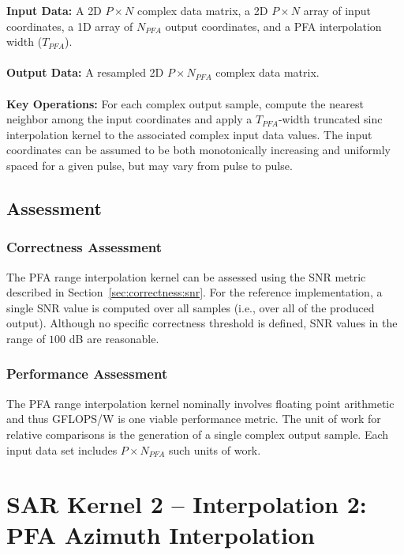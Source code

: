 \documentclass{report}
\begin{document}
\textbf{Input Data:} A {2D} $P \times N$ complex data matrix,
a {2D} $P \times N$ array of input coordinates, a {1D} array
of $N_{PFA}$ output coordinates, and a PFA interpolation width ($T_{PFA}$). \\ \\
\textbf{Output Data:} 
A resampled {2D} $P \times N_{PFA}$ complex data matrix. \\ \\
\textbf{Key Operations:} For each complex output sample, compute the nearest neighbor among
the input coordinates and apply a $T_{PFA}$-width truncated sinc interpolation kernel
to the associated complex input data values.
The input coordinates can be assumed to be both monotonically increasing and uniformly
spaced for a given pulse, but may vary from pulse to pulse.

\subsection{Assessment}

\subsubsection{Correctness Assessment}

The PFA range interpolation kernel can be assessed using the SNR metric described
in Section~\ref{sec:correctness:snr}.
For the reference implementation, a single SNR value is computed over all
samples (i.e., over all of the produced output).
Although no specific correctness threshold is defined, SNR values in the
range of $100$ dB are reasonable.

\subsubsection{Performance Assessment}

The PFA range interpolation kernel nominally involves floating point arithmetic
and thus GFLOPS/W is one viable performance metric.
The unit of work for relative comparisons is the generation of a single complex
output sample.
Each input data set includes $P \times N_{PFA}$ such units of work.


\section{SAR Kernel 2 -- Interpolation 2: \\ PFA Azimuth Interpolation}
\end{document}
